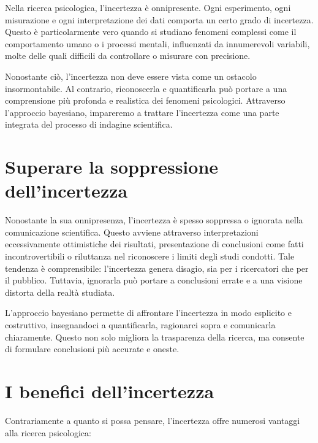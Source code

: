 \documentclass[
  letterpaper,
  krantz2]{{[}./krantz{]}}
\begin{document}
Nella ricerca psicologica, l'incertezza è onnipresente. Ogni
esperimento, ogni misurazione e ogni interpretazione dei dati comporta
un certo grado di incertezza. Questo è particolarmente vero quando si
studiano fenomeni complessi come il comportamento umano o i processi
mentali, influenzati da innumerevoli variabili, molte delle quali
difficili da controllare o misurare con precisione.

Nonostante ciò, l'incertezza non deve essere vista come un ostacolo
insormontabile. Al contrario, riconoscerla e quantificarla può portare a
una comprensione più profonda e realistica dei fenomeni psicologici.
Attraverso l'approccio bayesiano, impareremo a trattare l'incertezza
come una parte integrata del processo di indagine scientifica.

\section{Superare la soppressione
dell'incertezza}\label{superare-la-soppressione-dellincertezza}

Nonostante la sua onnipresenza, l'incertezza è spesso soppressa o
ignorata nella comunicazione scientifica. Questo avviene attraverso
interpretazioni eccessivamente ottimistiche dei risultati, presentazione
di conclusioni come fatti incontrovertibili o riluttanza nel riconoscere
i limiti degli studi condotti. Tale tendenza è comprensibile:
l'incertezza genera disagio, sia per i ricercatori che per il pubblico.
Tuttavia, ignorarla può portare a conclusioni errate e a una visione
distorta della realtà studiata.

L'approccio bayesiano permette di affrontare l'incertezza in modo
esplicito e costruttivo, insegnandoci a quantificarla, ragionarci sopra
e comunicarla chiaramente. Questo non solo migliora la trasparenza della
ricerca, ma consente di formulare conclusioni più accurate e oneste.

\section{I benefici dell'incertezza}\label{i-benefici-dellincertezza}

Contrariamente a quanto si possa pensare, l'incertezza offre numerosi
vantaggi alla ricerca psicologica:
\end{document}
